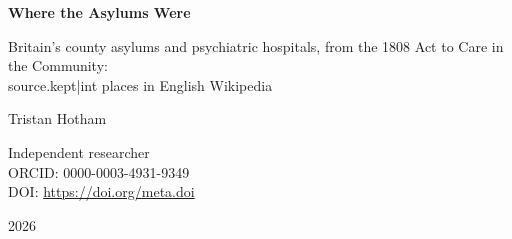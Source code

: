 \documentclass[11pt,a4paper]{article}
\begin{document}
\begin{center}
{\Large\bfseries Where the Asylums Were\par}
\vspace{0.4em}
{\large Britain's county asylums and psychiatric hospitals, from the 1808 Act to Care in the Community:\\{{source.kept|int}} places in English Wikipedia\par}
\vspace{1.2em}
{\large Tristan Hotham\par}
\vspace{0.3em}
{\small Independent researcher\\
ORCID: 0000-0003-4931-9349\\
DOI: \href{https://doi.org/{{meta.doi}}}{https://doi.org/{{meta.doi}}}\par}
\vspace{0.8em}
2026
\end{center}
\end{document}

